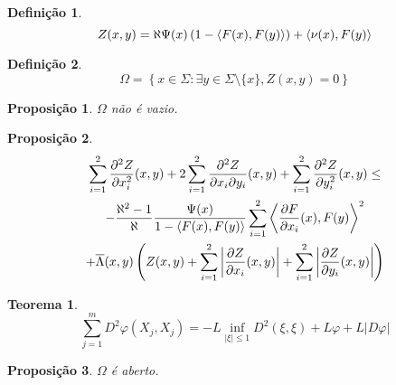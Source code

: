 \documentclass[12pt,a4paper]{beamer}
\newtheorem{teorema}{Teorema}
\newtheorem{proposicao}{Proposição}
\theoremstyle{definition}
\newtheorem{definicao}{Definição}
\begin{document}
\begin{frame}
	\begin{definicao}
		\begin{equation*}
			Z(x,y) = \aleph \Psi(x) \left(1 - \left\langle F(x),F(y) \right\rangle \right) + \left\langle \nu(x),F(y) \right\rangle
		\end{equation*}
	\end{definicao}
\end{frame}

\begin{frame}
	\begin{definicao}
		\begin{equation*}
		\Omega = \left\{ x \in \Sigma: \exists y \in \Sigma \setminus \{ x \}, Z(x,y)=0 \right\}
		\end{equation*}
	\end{definicao}
\end{frame}

\begin{frame}
	\begin{proposicao}
		$\Omega$ não é vazio.
	\end{proposicao}
\end{frame}

\begin{frame}
	\begin{proposicao}
		\begin{multline*}
			\sum_{i=1}^{2} \frac{\partial^2 Z}{\partial x_i^2}(x,y) + 2 \sum_{i=1}^{2} \frac{\partial^2 Z}{\partial x_i \partial y_i}(x,y) + \sum_{i=1}^{2} \frac{\partial^2 Z}{\partial y_i^2}(x,y) \leq \\
			- \frac{\aleph^2 -1}{\aleph} \frac{\Psi(x)}{1 - \left\langle F(x),F(y) \right\rangle} \sum_{i=1}^{2} \left\langle \frac{\partial F}{\partial x_i}(x),F(y) \right\rangle^2 \\ 
			+ \overline{\Lambda}(x,y) \left( Z(x,y) + \sum_{i=1}^{2} \left| \frac{\partial Z}{\partial x_i}(x,y) \right| + \sum_{i=1}^{2} \left| \frac{\partial Z}{\partial y_i}(x,y) \right| \right)
		\end{multline*}
	\end{proposicao}
\end{frame}

\begin{frame}
	\begin{teorema}
		\begin{equation*}
			\sum_{j=1}^{m} D^2 \varphi (X_j,X_j) = -L \inf_{|\xi| \leq 1} D^2 (\xi,\xi) + L \varphi + L |D \varphi|
		\end{equation*}
	\end{teorema}
\end{frame}

\begin{frame}
	\begin{proposicao}
		$\Omega$ é aberto.
	\end{proposicao}
\end{frame}
\end{document}
